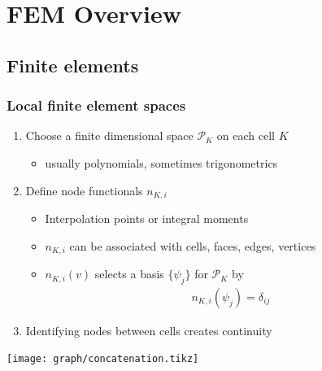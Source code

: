 \section{FEM Overview}

\lstset{language=bash,
  basicstyle=\ttfamily,
  keywordstyle=\ttfamily,
  showtabs=true,
  tabsize=3,
  tab=\hrulefill}
\subsection{Finite elements}

\begin{frame}
  \frametitle{Local finite element spaces}
  \begin{enumerate}
  \item Choose a finite dimensional space $\mathcal P_K$ on each cell $K$
    \begin{itemize}
    \item usually polynomials, sometimes trigonometrics
    \end{itemize}
  \item Define node functionals $n_{K,i}$
    \begin{itemize}
    \item Interpolation points or integral moments
    \item $n_{K,i}$ can be associated with cells, faces, edges,
      vertices
    \item $n_{K,i}(v)$ selects a basis $\{\psi_j\}$ for $\mathcal P_K$ by
      \begin{gather*}
        n_{K,i}(\psi_j) = \delta_{ij}
      \end{gather*}
    \end{itemize}
  \item Identifying nodes between cells creates continuity
  \end{enumerate}
  \begin{center}
    \texttt{[image: graph/concatenation.tikz]}
  \end{center}
\end{frame}

